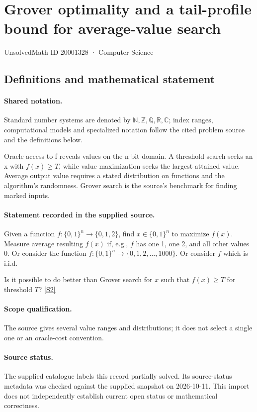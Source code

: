 \documentclass[11pt]{article}
\newcommand{\sref}[2]{\hyperlink{source:#1:#2}{[S#2]}}
\begin{document}
\setcounter{section}{20001327}
\section{Grover optimality and a tail-profile bound for average-value search}\label{20001328}
{\small\sffamily UnsolvedMath ID 20001328 · Computer Science}
\subsection{Definitions and mathematical statement}

\paragraph{Shared notation.}Standard number systems are denoted by $\mathbb N,\mathbb Z,\mathbb Q,\mathbb R,\mathbb C$; index ranges, computational models and specialized notation follow the cited problem source and the definitions below.


Oracle access to f reveals values on the n-bit domain. A threshold search seeks an x with $f(x)\ge T$, while value maximization seeks the largest attained value. Average output value requires a stated distribution on functions and the algorithm's randomness. Grover search is the source's benchmark for finding marked inputs.
\paragraph{Statement recorded in the supplied source.}
Given a function $f:\{0,1\}^n \to \{0,1,2\}$, find $x\in \{0,1\}^n$ to maximize $f(x)$. Measure average resulting $f(x)$ if, e.g., $f$ has one 1, one 2, and all other values 0. Or consider the function $f:\{0,1\}^n \to \{0,1,2, \dots, 1000\}$. Or consider $f$ which is i.i.d.

Is it possible to do better than Grover search for $x$ such that $f(x) \geq T$ for threshold $T$? \sref{20001328}{2}
\paragraph{Scope qualification.}
The source gives several value ranges and distributions; it does not select a single one or an oracle-cost convention.
\paragraph{Source status.}
The supplied catalogue labels this record partially solved. Its source-status metadata was checked against the supplied snapshot on 2026-10-11. This import does not independently establish current open status or mathematical correctness.
\end{document}
